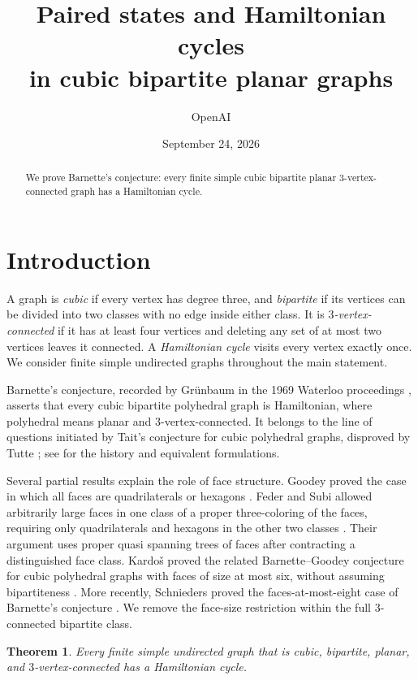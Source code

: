 \documentclass[11pt]{article}
\title{Paired states and Hamiltonian cycles\\
in cubic bipartite planar graphs}
\author{OpenAI}
\date{September 24, 2026}
\newtheorem{theorem}{Theorem}[section]
\theoremstyle{remark}
\numberwithin{equation}{section}
\begin{document}
\maketitle
\begin{abstract}
We prove Barnette's conjecture: every finite simple cubic bipartite planar
\(3\)-vertex-connected graph has a Hamiltonian cycle.
\end{abstract}

\section{Introduction}

A graph is \emph{cubic} if every vertex has degree three, and
\emph{bipartite} if its vertices can be divided into two classes with
no edge inside either class. It is \emph{\(3\)-vertex-connected} if it
has at least four vertices and deleting any set of at most two vertices
leaves it connected. A \emph{Hamiltonian cycle} visits every vertex
exactly once. We consider finite simple undirected graphs throughout
the main statement.

Barnette's conjecture, recorded by Gr\"unbaum in the 1969 Waterloo
proceedings \cite{Barnette1969}, asserts that every cubic bipartite polyhedral
graph is Hamiltonian, where polyhedral means planar and
\(3\)-vertex-connected. It belongs to the line of questions initiated
by Tait's conjecture for cubic polyhedral graphs, disproved by
Tutte \cite{Tutte1946}; see \citet{APSW2016,GSW2023} for the history
and equivalent formulations.

Several partial results explain the role of face structure.
Goodey proved the case in which all faces are quadrilaterals or
hexagons \cite{Goodey1975}. Feder and Subi allowed arbitrarily
large faces in one class of a proper three-coloring of the faces,
requiring only quadrilaterals and hexagons in the other two classes
\cite{FederSubi2006}. Their argument uses proper quasi spanning trees of faces
after contracting a distinguished face class. Kardo\v{s} proved
the related Barnette--Goodey conjecture for cubic polyhedral graphs
with faces of size at most six, without assuming bipartiteness
\cite{Kardos2020}. More recently, Schnieders proved the
faces-at-most-eight case of Barnette's conjecture
\cite[Corollary~1.13]{Schnieders2025}. We remove the face-size
restriction within the full \(3\)-connected bipartite class.

\begin{theorem}\label{thm:main}
Every finite simple undirected graph that is cubic, bipartite,
planar, and \(3\)-vertex-connected has a Hamiltonian cycle.
\end{theorem}
\end{document}
